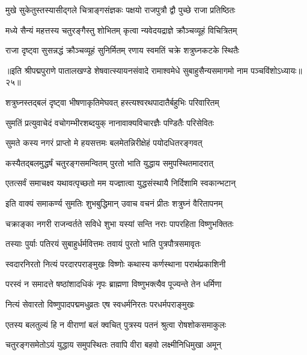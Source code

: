 \twolineshloka
{मुखे सुकेतुस्तस्यासीद्गले चित्राङ्गसंज्ञकः}
{पक्षयो राजपुत्रौ द्वौ पुच्छे राजा प्रतिष्ठितः}%

\twolineshloka
{मध्ये सैन्यं महत्तस्य चतुरङ्गैस्तु शोभितम्}
{कृत्वा न्यवेदयद्राज्ञे क्रौञ्चव्यूहं विचित्रितम्}%

\twolineshloka
{राजा दृष्ट्वा सुसन्नद्धं क्रौञ्चव्यूहं सुनिर्मितम्}
{रणाय स्वमतिं चक्रे शत्रुघ्नकटके स्थितैः}%

{॥इति श्रीपद्मपुराणे पातालखण्डे शेषवात्स्यायनसंवादे रामाश्वमेधे सुबाहुसैन्यसमागमो नाम पञ्चविंशोऽध्यायः॥२५॥}

\resetShloka


\twolineshloka
{शत्रुघ्नस्तद्बलं दृष्ट्वा भीषणाकृतिमेघवत्}
{हस्त्यश्वरथपादातैर्बहुभिः परिवारितम्}%

\twolineshloka
{सुमतिं प्रत्युवाचेदं वचोगम्भीरशब्दयुक्}
{नानावाक्यविचारज्ञैः पण्डितैः परिसेवितः}%


\twolineshloka
{सुमते कस्य नगरं प्राप्तो मे हयसत्तमः}
{बलमेतन्निरीक्षेहं पयोदधितरङ्गवत्}%

\twolineshloka
{कस्यैतद्बलमुद्धर्षं चतुरङ्गसमन्वितम्}
{पुरतो भाति युद्धाय समुपस्थितमादरात्}%

\twolineshloka
{एतत्सर्वं समाचक्ष्व यथावत्पृच्छतो मम}
{यज्ज्ञात्वा युद्धसंस्थायै निर्दिशामि स्वकान्भटान्}%

\twolineshloka
{इति वाक्यं समाकर्ण्य सुमतिः शुभबुद्धिमान्}
{उवाच वचनं प्रीतः शत्रुघ्नं वैरितापनम्}%


\twolineshloka
{चक्राङ्का नगरी राजन्वर्तते सविधे शुभा}
{यस्यां सन्ति नराः पापरहिता विष्णुभक्तितः}%

\twolineshloka
{तस्याः पुर्याः पतिरयं सुबाहुर्धर्मवित्तमः}
{तवायं पुरतो भाति पुत्रपौत्रसमावृतः}%

\twolineshloka
{स्वदारनिरतो नित्यं परदारपराङ्मुखः}
{विष्णोः कथास्य कर्णस्थाना परार्थप्रकाशिनी}%

\twolineshloka
{परस्वं न समादत्ते षष्ठांशादधिकं नृपः}
{ब्राह्मणा विष्णुभक्त्यैव पूज्यन्ते तेन धर्मिणा}%

\twolineshloka
{नित्यं सेवारतो विष्णुपादपद्ममधुव्रतः}
{एष स्वधर्मनिरतः परधर्मपराङ्मुखः}%

\twolineshloka
{एतस्य बलतुल्यं हि न वीराणां बलं क्वचित्}
{पुत्रस्य पतनं श्रुत्वा रोषशोकसमाकुलः}%

\twolineshloka
{चतुरङ्गसमेतोऽयं युद्धाय समुपस्थितः}
{तवापि वीरा बहवो लक्ष्मीनिधिमुखा अमून्}%

